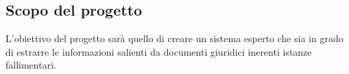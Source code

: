 



%

%
%

\subsection{Scopo del progetto}
L'obiettivo del progetto sarà quello di creare un sistema esperto che sia in grado di estrarre le informazioni salienti da documenti giuridici inerenti istanze fallimentari.